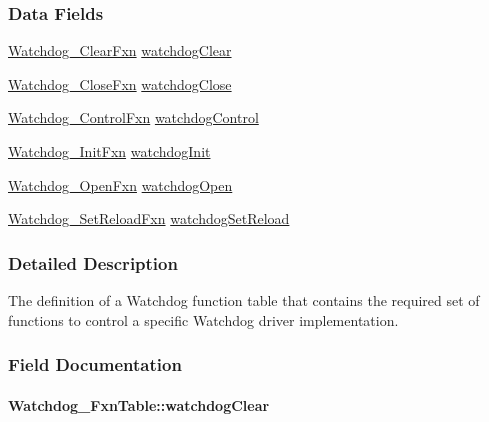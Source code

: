 \subsubsection*{Data Fields}
\begin{DoxyCompactItemize}
\item 
\hyperlink{_watchdog_8h_a23a5b26733f63039daa93378d5307a7d}{Watchdog\-\_\-\-Clear\-Fxn} \hyperlink{struct_watchdog___fxn_table_a925066f771f1c4ad0e8607e8aa6aee4f}{watchdog\-Clear}
\item 
\hyperlink{_watchdog_8h_a52c6b4db063cd428c000c7951175f197}{Watchdog\-\_\-\-Close\-Fxn} \hyperlink{struct_watchdog___fxn_table_a4e8c8b1da4a51c4b76d33e702637f326}{watchdog\-Close}
\item 
\hyperlink{_watchdog_8h_a36965c48da25f952175822d0f81e1a0a}{Watchdog\-\_\-\-Control\-Fxn} \hyperlink{struct_watchdog___fxn_table_a415d44b4771fd48395105c5644a14429}{watchdog\-Control}
\item 
\hyperlink{_watchdog_8h_a21594bd6db5b508572ae7d380b8fae10}{Watchdog\-\_\-\-Init\-Fxn} \hyperlink{struct_watchdog___fxn_table_a098c5fc8de0d3bf2071960387156c3a2}{watchdog\-Init}
\item 
\hyperlink{_watchdog_8h_a4b02084ebc2b2eccc46861ace7881448}{Watchdog\-\_\-\-Open\-Fxn} \hyperlink{struct_watchdog___fxn_table_aaff59460698cbba41fca6660c44ee9c0}{watchdog\-Open}
\item 
\hyperlink{_watchdog_8h_a420d19a34109e5dbb1b5f2953f9a8328}{Watchdog\-\_\-\-Set\-Reload\-Fxn} \hyperlink{struct_watchdog___fxn_table_aff9226f8aff3780cf4a05d3e0adf7ea4}{watchdog\-Set\-Reload}
\end{DoxyCompactItemize}


\subsubsection{Detailed Description}
The definition of a Watchdog function table that contains the required set of functions to control a specific Watchdog driver implementation. 

\subsubsection{Field Documentation}
\paragraph[{watchdog\-Clear}]{ Watchdog\-\_\-\-Fxn\-Table\-::watchdog\-Clear}\label{struct_watchdog___fxn_table_a925066f771f1c4ad0e8607e8aa6aee4f}
